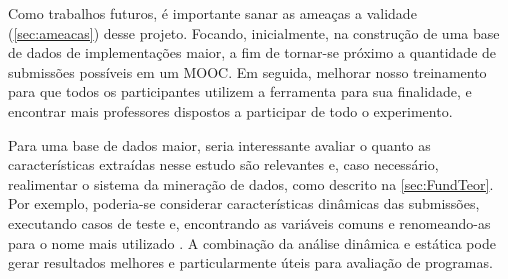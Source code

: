 	Como trabalhos futuros, é importante sanar as ameaças a validade (\cref{sec:ameacas})
	desse projeto. Focando, inicialmente, na construção de uma base de dados de
	implementações maior, a fim de tornar-se próximo a quantidade de submissões
	possíveis em um \acs{MOOC}. Em seguida, melhorar nosso treinamento para que
	todos os participantes utilizem a ferramenta para sua finalidade, e encontrar
	mais professores dispostos a participar de todo o experimento.
	
	Para uma base de dados maior, seria interessante avaliar o quanto as características
	extraídas nesse estudo são relevantes e, caso necessário, realimentar o
	sistema da mineração de dados, como descrito na \cref{sec:FundTeor}. Por
	exemplo, poderia-se considerar características dinâmicas das submissões, executando
	casos de teste e, encontrando as variáveis
	comuns e renomeando-as para o nome mais utilizado \cite{Glassman:2015}.
	A combinação da análise dinâmica e estática pode gerar resultados melhores e
	particularmente úteis para avaliação de programas.